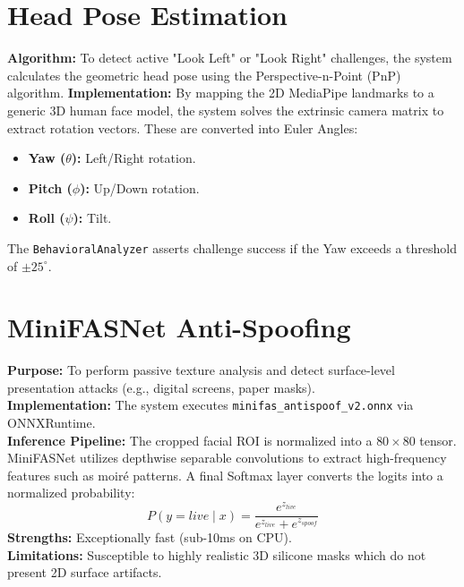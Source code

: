 \documentclass[12pt, a4paper]{report}
\begin{document}
\section{Head Pose Estimation}
\textbf{Algorithm:} To detect active "Look Left" or "Look Right" challenges, the system calculates the geometric head pose using the Perspective-n-Point (PnP) algorithm.
\textbf{Implementation:} By mapping the 2D MediaPipe landmarks to a generic 3D human face model, the system solves the extrinsic camera matrix to extract rotation vectors. These are converted into Euler Angles:
\begin{itemize}
    \item \textbf{Yaw ($\theta$):} Left/Right rotation.
    \item \textbf{Pitch ($\phi$):} Up/Down rotation.
    \item \textbf{Roll ($\psi$):} Tilt.
\end{itemize}
The \texttt{BehavioralAnalyzer} asserts challenge success if the Yaw exceeds a threshold of $\pm 25^{\circ}$.

\section{MiniFASNet Anti-Spoofing}
\textbf{Purpose:} To perform passive texture analysis and detect surface-level presentation attacks (e.g., digital screens, paper masks). \\
\textbf{Implementation:} The system executes \texttt{minifas\_antispoof\_v2.onnx} via ONNXRuntime. \\
\textbf{Inference Pipeline:} The cropped facial ROI is normalized into a $80 \times 80$ tensor. MiniFASNet utilizes depthwise separable convolutions to extract high-frequency features such as moiré patterns. A final Softmax layer converts the logits into a normalized probability:
\begin{equation}
P(y=live \mid x) = \frac{e^{z_{live}}}{e^{z_{live}} + e^{z_{spoof}}}
\end{equation}
\textbf{Strengths:} Exceptionally fast (sub-10ms on CPU). \\
\textbf{Limitations:} Susceptible to highly realistic 3D silicone masks which do not present 2D surface artifacts.
\end{document}
